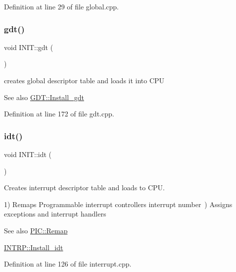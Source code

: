Definition at line 29 of file global.\+cpp.

\mbox{\label{namespace_i_n_i_t_a3462d7bc51bce77cc240d05b62b1b777}} 
\subsubsection{\texorpdfstring{gdt()}{gdt()}}
{\footnotesize\ttfamily void I\+N\+I\+T\+::gdt (\begin{DoxyParamCaption}{ }\end{DoxyParamCaption})}



creates global descriptor table and loads it into C\+PU 

\begin{DoxySeeAlso}{See also}
\hyperlink{namespace_g_d_t_a174feb7c5a037cc991bf4eb27c256366}{G\+D\+T\+::\+Install\+\_\+gdt} 
\end{DoxySeeAlso}


Definition at line 172 of file gdt.\+cpp.

\mbox{\label{namespace_i_n_i_t_aec8e9f01cb09653075b6e610096b3ca9}} 
\subsubsection{\texorpdfstring{idt()}{idt()}}
{\footnotesize\ttfamily void I\+N\+I\+T\+::idt (\begin{DoxyParamCaption}{ }\end{DoxyParamCaption})}



Creates interrupt descriptor table and loads to C\+PU. 

1) Remaps Programmable interrupt controller\textquotesingle{}s interrupt number~) Assigns exceptions and interrupt handlers \begin{DoxySeeAlso}{See also}
\hyperlink{namespace_p_i_c_a2a04fe95329faacc43f00ad30fe554b9}{P\+I\+C\+::\+Remap} 

\hyperlink{namespace_i_n_t_r_p_a139b273cc1e45d3c2fdfe0d387a98518}{I\+N\+T\+R\+P\+::\+Install\+\_\+idt} 
\end{DoxySeeAlso}


Definition at line 126 of file interrupt.\+cpp.

